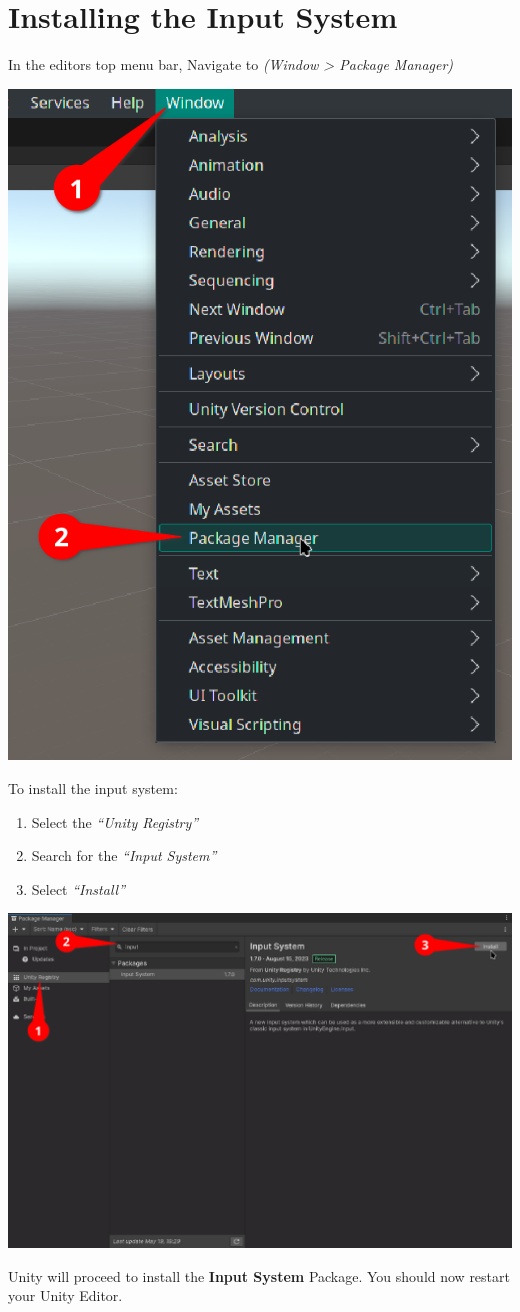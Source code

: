 \documentclass[a4paper,11pt,twoside]{article}
\begin{document}
\section*{Installing the Input System}
\label{sec:org4f675d4}
In the editors top menu bar, Navigate to \emph{(Window > Package Manager)}
\begin{center}
\includegraphics[width=.9\linewidth]{./SnapShots/PackageManager.png}
\end{center}
To install the input system:
\begin{enumerate}
\item Select the \emph{``Unity Registry''}
\item Search for the \emph{``Input System''}
\item Select \emph{``Install''}
\end{enumerate}
\begin{center}
\includegraphics[width=.9\linewidth]{./SnapShots/Installing.png}
\end{center}
Unity will proceed to install the \textbf{Input System} Package. You should now restart your Unity Editor.
\end{document}
